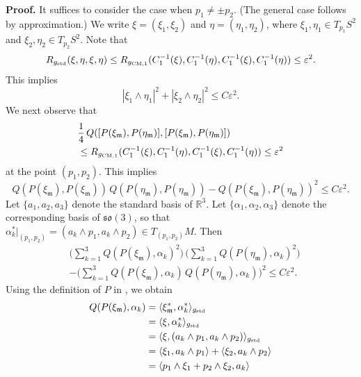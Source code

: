 \documentclass[11pt]{amsart}
\theoremstyle{definition}
\begin{document}
\textbf{Proof.} 
It suffices to consider the case when $p_1 \neq \pm p_2$. (The general case follows by approximation.) We write $\xi = (\xi_1,\xi_2)$ and $\eta = (\eta_1,\eta_2)$, where $\xi_1,\eta_1 \in T_{p_1} S^2$ and $\xi_2,\eta_2 \in T_{p_2} S^2$. Note that 
\[R_{g_{\text{\rm std}}}(\xi,\eta,\xi,\eta) \leq R_{g_{\text{\rm CM},1}}(C_1^{-1}(\xi),C_1^{-1}(\eta),C_1^{-1}(\xi),C_1^{-1}(\eta)) \leq \varepsilon^2.\] 
This implies 
\begin{equation}
\label{a}
|\xi_1 \wedge \eta_1|^2 + |\xi_2 \wedge \eta_2|^2 \leq C\varepsilon^2. 
\end{equation}
We next observe that 
\begin{align*} 
&\frac{1}{4} \, Q([P(\xi_{\mathfrak{m}}),P(\eta_{\mathfrak{m}})],[P(\xi_{\mathfrak{m}}),P(\eta_{\mathfrak{m}})]) \\ 
&\leq R_{g_{\text{\rm CM},1}}(C_1^{-1}(\xi),C_1^{-1}(\eta),C_1^{-1}(\xi),C_1^{-1}(\eta)) \leq \varepsilon^2 
\end{align*}
at the point $(p_1,p_2)$. This implies 
\[Q(P(\xi_{\mathfrak{m}}),P(\xi_{\mathfrak{m}})) \, Q(P(\eta_{\mathfrak{m}}),P(\eta_{\mathfrak{m}})) - Q(P(\xi_{\mathfrak{m}}),P(\eta_{\mathfrak{m}}))^2 \leq C\varepsilon^2.\] 
Let $\{a_1,a_2,a_3\}$ denote the standard basis of $\mathbb{R}^3$. Let $\{\alpha_1,\alpha_2,\alpha_3\}$ denote the corresponding basis of $\mathfrak{so}(3)$, so that $\alpha_k^*|_{(p_1,p_2)} = (a_k \wedge p_1,a_k \wedge p_2) \in T_{(p_1,p_2)} M$. Then 
\begin{align*} 
&\Big ( \sum_{k=1}^3 Q(P(\xi_{\mathfrak{m}}),\alpha_k)^2 \Big ) \, \Big ( \sum_{k=1}^3 Q(P(\eta_{\mathfrak{m}}),\alpha_k)^2 \Big ) \\ 
&- \Big ( \sum_{k=1}^3 Q(P(\xi_{\mathfrak{m}}),\alpha_k) \, Q(P(\eta_{\mathfrak{m}}),\alpha_k) \Big )^2 \leq C\varepsilon^2. 
\end{align*}
Using the definition of $P$ in \cite{Ziller}, we obtain 
\begin{align*} 
Q(P(\xi_{\mathfrak{m}}),\alpha_k) 
&= \langle \xi_{\mathfrak{m}}^*,\alpha_k^* \rangle_{g_{\text{\rm std}}} \\ 
&= \langle \xi,\alpha_k^* \rangle_{g_{\text{\rm std}}} \\ 
&= \langle \xi,(a_k \wedge p_1,a_k \wedge p_2) \rangle_{g_{\text{\rm std}}} \\ 
&= \langle \xi_1,a_k \wedge p_1 \rangle + \langle \xi_2,a_k \wedge p_2 \rangle \\ 
&= \langle p_1 \wedge \xi_1 + p_2 \wedge \xi_2,a_k \rangle 
\end{align*}
\end{document}
